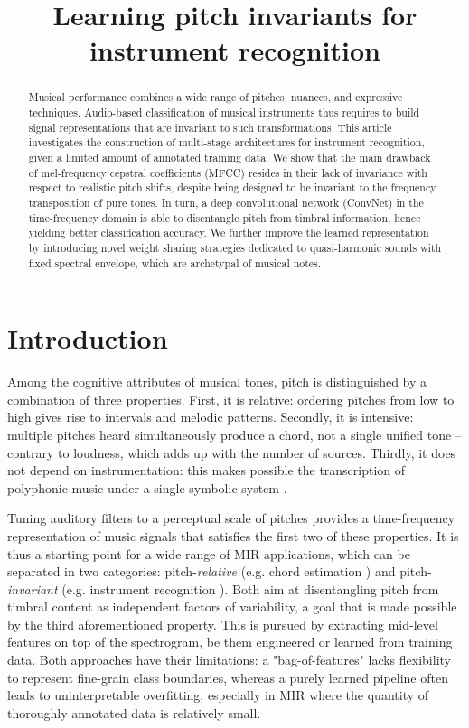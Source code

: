 \documentclass{article}
\title{Learning pitch invariants for instrument recognition}
\makeatletter
\newcommand*{\eg}{e.g.\@\xspace}
\makeatother
\begin{document}
%
\maketitle
%
\begin{abstract}
Musical performance combines a wide range of pitches, nuances,
and expressive techniques.
Audio-based classification of musical instruments thus requires to
build signal representations that are invariant to such transformations.
This article investigates the construction
of multi-stage architectures for instrument recognition,
given a limited amount of annotated training data.
We show that the main drawback of mel-frequency cepstral
coefficients (MFCC) resides in their lack of invariance with respect to
realistic pitch shifts, despite being designed to be invariant
to the frequency transposition of pure tones.
In turn, a deep convolutional network (ConvNet)
in the time-frequency domain is able to disentangle pitch from
timbral information, hence yielding better classification accuracy.
We further improve the learned representation
by introducing novel weight sharing strategies dedicated to
quasi-harmonic sounds with fixed spectral envelope,
which are archetypal of musical notes.
\end{abstract}

\section{Introduction}\label{sec:introduction}
Among the cognitive attributes of musical tones, pitch is distinguished
by a combination of three properties.
First, it is relative: ordering pitches from low to high gives rise to
intervals and melodic patterns.
Secondly, it is intensive: multiple pitches heard simultaneously produce
a chord, not a single unified tone -- contrary to loudness, which adds
up with the number of sources.
Thirdly, it does not depend on instrumentation: this makes possible
the transcription of polyphonic music under a single symbolic system
\cite{deCheveigne2005}.

Tuning auditory filters to a perceptual scale of pitches provides a
time-frequency representation of music signals that satisfies the first two of these properties.
It is thus a starting point for a wide range of MIR applications,
which can be separated in two categories: pitch-\emph{relative}
(\eg chord estimation \cite{Humphrey2012tonnetz})
and pitch-\emph{invariant} (\eg instrument recognition \cite{Eronen2000}).
Both aim at disentangling pitch from timbral content as independent
factors of variability, a goal that is made possible by the third aforementioned property.
This is pursued by extracting mid-level features on top of the spectrogram,
be them engineered or learned from training data.
Both approaches have their limitations: a "bag-of-features" lacks flexibility
to represent fine-grain class boundaries, whereas a purely learned pipeline
often leads to uninterpretable overfitting, especially in MIR where the quantity
of thoroughly annotated data is relatively small.
\end{document}
